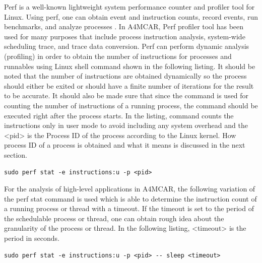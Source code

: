 Perf \cite{perf1} \cite{perf2} is a well-known lightweight system performance counter and profiler tool for Linux. Using perf, one can obtain event and instruction counts, record events, run benchmarks, and analyze processes \cite{perf1}. In A4MCAR, Perf profiler tool has been used for many purposes that include process instruction analysis, system-wide scheduling trace, and trace data conversion. Perf can perform dynamic analysis (profiling) in order to obtain the number of instructions for processes and runnables using Linux shell command shown in the following listing. It should be noted that the number of instructions are obtained dynamically so the process should either be exited or should have a finite number of iterations for the result to be accurate. It should also be made sure that since the command is used for counting the number of instructions of a running process, the command should be executed right after the process starts. In the listing, command counts the instructions only in user mode to avoid including any system overhead and the <pid> is the Process ID of the process according to the Linux kernel. How process ID of a process is obtained and what it means is discussed in the next section.
\begin{lstlisting}[style=bash]
sudo perf stat -e instructions:u -p <pid>
\end{lstlisting}
For the analysis of high-level applications in A4MCAR, the following variation of the perf stat command is used which is able to determine the instruction count of a running process or thread with a timeout. If the timeout is set to the period of the schedulable process or thread, one can obtain rough idea about the granularity of the process or thread. In the following listing, <timeout> is the period in seconds.
\begin{lstlisting}[style=bash]
sudo perf stat -e instructions:u -p <pid> -- sleep <timeout>
\end{lstlisting}

